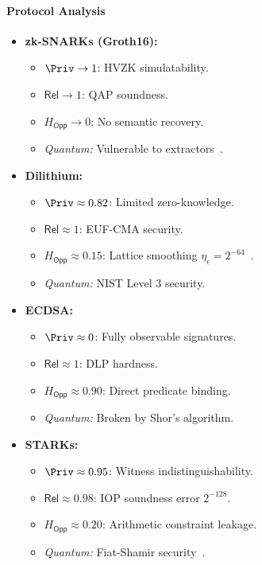 \documentclass[preprint,12pt]{elsarticle}
\newcommand{\Rel}{\mathsf{Rel}}
\begin{document}
            \paragraph{Protocol Analysis}
            \begin{itemize}
                \item \textbf{zk-SNARKs (Groth16):} 
                \begin{itemize}
                    \item $\Priv \to 1$: HVZK simulatability.
                    \item $\Rel \to 1$: QAP soundness.
                    \item $H_{\mathsf{Opp}} \to 0$: No semantic recovery.
                    \item \emph{Quantum:} Vulnerable to extractors~\cite{Don2019}.
                \end{itemize}
                
                \item \textbf{Dilithium:}
                \begin{itemize}
                    \item $\Priv \approx 0.82$: Limited zero-knowledge.
                    \item $\Rel \approx 1$: EUF-CMA security.
                    \item $H_{\mathsf{Opp}} \approx 0.15$: Lattice smoothing $\eta_\epsilon = 2^{-64}$~\cite{Bai2021}.
                    \item \emph{Quantum:} NIST Level 3 security.
                \end{itemize}
                
                \item \textbf{ECDSA:}
                \begin{itemize}
                    \item $\Priv \approx 0$: Fully observable signatures.
                    \item $\Rel \approx 1$: DLP hardness.
                    \item $H_{\mathsf{Opp}} \approx 0.90$: Direct predicate binding.
                    \item \emph{Quantum:} Broken by Shor's algorithm.
                \end{itemize}
                
                \item \textbf{STARKs:}
                \begin{itemize}
                    \item $\Priv \approx 0.95$: Witness indistinguishability.
                    \item $\Rel \approx 0.98$: IOP soundness error $2^{-128}$.
                    \item $H_{\mathsf{Opp}} \approx 0.20$: Arithmetic constraint leakage.
                    \item \emph{Quantum:} Fiat-Shamir security~\cite{Chiesa2020}.
                \end{itemize}
                

\end{itemize}
\end{document}
